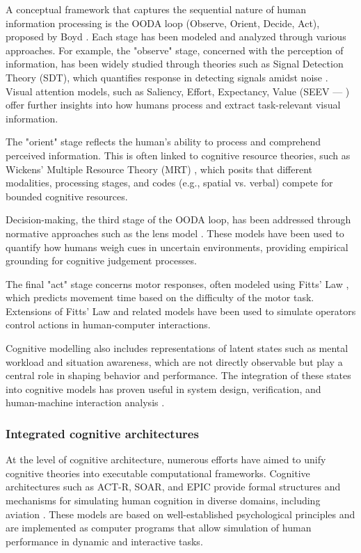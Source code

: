 \documentclass[12pt,a4paper]{article} %
\begin{document}
	A conceptual framework that captures the sequential nature of human information processing is the OODA loop (Observe, Orient, Decide, Act), proposed by Boyd \parencite{boyd_essence_1995}. Each stage has been modeled and analyzed through various approaches. For example, the "observe" stage, concerned with the perception of information, has been widely studied through theories such as Signal Detection Theory (SDT), which quantifies response in detecting signals amidst noise \parencite{swets_signal_2001}. Visual attention models, such as Saliency, Effort, Expectancy, Value (SEEV --- \textcite{wickens_attention_2021}) offer further insights into how humans process and extract task-relevant visual information.

	The "orient" stage reflects the human's ability to process and comprehend perceived information. This is often linked to cognitive resource theories, such as Wickens' Multiple Resource Theory (MRT) \parencite{wickens_processing_1991}, which posits that different modalities, processing stages, and codes (e.g., spatial vs. verbal) compete for bounded cognitive resources.

	Decision-making, the third stage of the OODA loop, has been addressed through normative approaches such as the lens model \parencite{brunswik_conceptual_1952}. These models have been used to quantify how humans weigh cues in uncertain environments, providing empirical grounding for cognitive judgement processes.

	The final "act" stage concerns motor responses, often modeled using Fitts' Law \parencite{fitts_information_1954}, which predicts movement time based on the difficulty of the motor task. Extensions of Fitts' Law and related models have been used to simulate operators control actions in human-computer interactions.

	Cognitive modelling also includes representations of latent states such as mental workload and situation awareness, which are not directly observable but play a central role in shaping behavior and performance. The integration of these states into cognitive models has proven useful in system design, verification, and human-machine interaction analysis \parencite{wang_survey_2023}.

	\subsubsection{Integrated cognitive architectures} At the level of cognitive architecture, numerous efforts have aimed to unify cognitive theories into executable computational frameworks. Cognitive architectures such as ACT-R, SOAR, and EPIC provide formal structures and mechanisms for simulating human cognition in diverse domains, including aviation \parencite{kirlik_conceptual_2007}. These models are based on well-established psychological principles and are implemented as computer programs that allow simulation of human performance in dynamic and interactive tasks.
\end{document}
